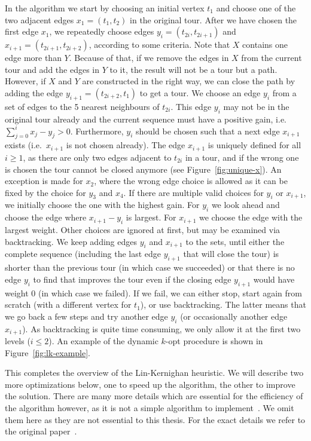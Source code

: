\documentclass[titlepage, 12pt]{article}
\begin{document}
    In the algorithm we start by choosing an initial vertex $t_1$ and choose one of the two
    adjacent edges $x_1 = (t_1, t_2)$ in the original tour.
    After we have chosen the first edge $x_1$, we repeatedly choose edges $y_i = (t_{2i}, t_{2i+1})$
    and $x_{i+1} = (t_{2i+1}, t_{2i+2})$, according to some criteria.
    Note that $X$ contains one edge more than $Y$. Because of that, if we remove the edges in $X$
    from the current tour and add the edges in $Y$ to it, the result will not be a tour but a path.
    However, if $X$ and $Y$ are constructed in the right way, we can close the path by adding the
    edge $y_{i+1} = (t_{2i+2}, t_1)$ to get a tour.
    We choose an edge $y_i$ from a set of edges to the 5 nearest neighbours of $t_{2i}$. This edge
    $y_i$ may not be in the original tour already and the current sequence must have a positive
    gain, i.e.\ $\sum_{j=0}^i x_j - y_j > 0$. Furthermore, $y_i$ should be chosen such that a next
    edge $x_{i+1}$ exists (i.e.\ $x_{i+1}$ is not chosen already).
    The edge $x_{i+1}$ is uniquely defined for all $i \geq 1$, as there are only two edges adjacent
    to $t_{2i}$ in a tour, and if the wrong one is chosen the tour cannot be closed anymore (see
    Figure~\ref{fig:unique-x}).
    An exception is made for $x_2$, where the wrong edge choice is allowed as it can be fixed by
    the choice for $y_3$ and $x_4$.
    If there are multiple valid choices for $y_i$ or $x_{i+1}$, we initially choose the one with the
    highest gain. For $y_i$ we look ahead and choose the edge where $x_{i+1} - y_i$ is largest.
    For $x_{i+1}$ we choose the edge with the largest weight. Other choices are ignored at first,
    but may be examined via backtracking.
    We keep adding edges $y_i$ and $x_{i+1}$ to the sets, until either the complete sequence
    (including the last edge $y_{i+1}$ that will close the tour) is shorter than the previous tour
    (in which case we succeeded) or that there is no edge $y_i$ to find that improves the tour even
    if the closing edge $y_{i+1}$ would have weight 0 (in which case we failed).
    If we fail, we can either stop, start again from scratch (with a different vertex for $t_1$), or
    use backtracking. The latter means that we go back a few steps and try another edge $y_i$ (or
    occasionally another edge $x_{i+1}$).
    As backtracking is quite time consuming, we only allow it at the first two levels ($i \leq 2$).
    An example of the dynamic $k$-opt procedure is shown in Figure~\ref{fig:lk-example}.

    This completes the overview of the Lin-Kernighan heuristic. We will describe two more
    optimizations below, one to speed up the algorithm, the other to improve the solution. There are
    many more details which are essential for the efficiency of the algorithm however, as it is not
    a simple algorithm to implement~\cite{lkh1}. We omit them here as they are not essential to this
    thesis. For the exact details we refer to the original paper~\cite{lin-kernighan}.
\end{document}
